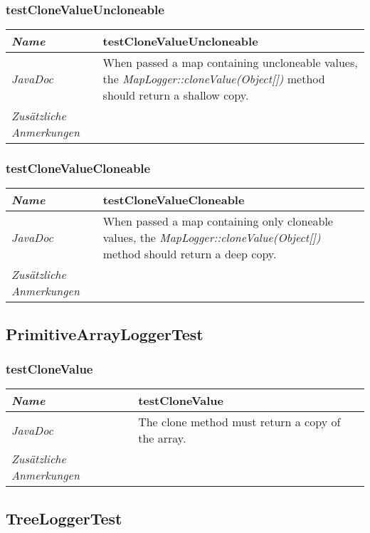 \documentclass[a4paper]{report}
\begin{document}
\subsubsection{testCloneValueUncloneable}
\begin{tabular}{p{2.3cm}  p{11.5cm}}
  \hline
 \textit{Name} & testCloneValueUncloneable\\
  \hline
 \textit{JavaDoc} & When passed a map containing uncloneable values, the \emph{MapLogger::cloneValue(Object[])} method should return a shallow copy.\\
  \hline
 \textit{Zusätzliche Anmerkungen} & \\
  \hline
\end{tabular}

\subsubsection{testCloneValueCloneable}
\begin{tabular}{p{2.3cm}  p{11.5cm}}
  \hline
 \textit{Name} & testCloneValueCloneable\\
  \hline
 \textit{JavaDoc} & When passed a map containing only cloneable values, the \emph{MapLogger::cloneValue(Object[])} method should return a deep copy.\\
  \hline
 \textit{Zusätzliche Anmerkungen} & \\
  \hline
\end{tabular}

\subsection{PrimitiveArrayLoggerTest}

\subsubsection{testCloneValue}
\begin{tabular}{p{2.3cm}  p{11.5cm}}
  \hline
 \textit{Name} & testCloneValue\\
  \hline
 \textit{JavaDoc} & The clone method must return a copy of the array. \\
  \hline
 \textit{Zusätzliche Anmerkungen} & \\
  \hline
\end{tabular}

\subsection{TreeLoggerTest}
\end{document}
